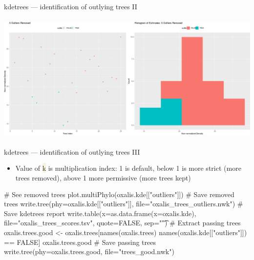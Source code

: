 \documentclass[compress, xelatex, 11pt, xcolor=svgnames, aspectratio=169,
	hyperref={
		bookmarks=true,
		unicode=true,
		colorlinks=true,
		pdftitle={Molecular data in R},
		plainpages=false,
		pdfauthor={Vojtech Zeisek},
		pdfsubject={Course about phylogeny and evolution in R},
		pdfcreator={XeLaTeX},
		pdfkeywords={R, evolution, phylogeny, molecular data},
		linkcolor=Crimson, %
		anchorcolor=Magenta, %
		citecolor=Magenta, %
		filecolor=Magenta, %
		menucolor=Magenta, %
		urlcolor=DodgerBlue, %
		},
	url={hyphens, lowtilde} %
	]{beamer}
\renewcommand{\texttt}[1]{\colorbox{Beige}{{\ttfamily #1}}}
\begin{document}
\begin{frame}{kdetrees --- identification of outlying trees II}
	\begin{center}
		\includegraphics[height=6.5cm]{kdetrees.png}
	\end{center}
\end{frame}

\begin{frame}[fragile]{kdetrees --- identification of outlying trees III}
	\begin{itemize}
		\item Value of \texttt{k} is multiplication index: 1 is default, below 1 is more strict (more trees removed), above 1 more permissive (more trees kept)
	\end{itemize}
	\begin{spluscode}
    # See removed trees
    plot.multiPhylo(oxalis.kde[["outliers"]])
    # Save removed trees
    write.tree(phy=oxalis.kde[["outliers"]], file="oxalis_trees_outliers.nwk")
    # Save kdetrees report
    write.table(x=as.data.frame(x=oxalis.kde), file="oxalis_trees_scores.tsv",
      quote=FALSE, sep="\t")
    # Extract passing trees
    oxalis.trees.good <- oxalis.trees[names(oxalis.trees) %
      names(oxalis.kde[["outliers"]]) == FALSE]
    oxalis.trees.good
    # Save passing trees
    write.tree(phy=oxalis.trees.good, file="trees_good.nwk")
	\end{spluscode}
\end{frame}
\end{document}
